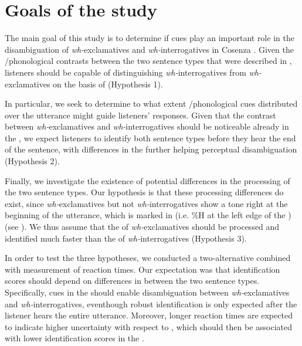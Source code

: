 \documentclass[output=paper]{langsci/langscibook}
\begin{document}
\section{Goals of the study}
\label{sec:kel:3}

The main goal of this study is to determine if  cues play an important role in the disambiguation of \textit{wh-}exclamatives and \textit{wh-}interrogatives in Cosenza . Given the /phonological contrasts between the two sentence types that were described in , listeners should be capable of distinguishing \textit{wh-}interrogatives from \textit{wh-}exclamatives on the basis of  (Hypothesis 1).

In particular, we seek to determine to what extent /phonological cues distributed over the utterance might guide listeners' responses. Given that the contrast between \textit{wh-}exclamatives and \textit{wh-}interrogatives should be noticeable already in the  \citep{Sorianello2011exclamative}, we expect listeners to identify both sentence types before they hear the end of the sentence, with differences in the  further helping perceptual disambiguation (Hypothesis 2).

Finally, we investigate the existence of potential differences in the processing of the two sentence types. Our hypothesis is that these processing differences do exist, since \textit{wh-}exclamatives but not \textit{wh-}interrogatives show a  tone right at the beginning of the utterance, which is marked in  (i.e. \%H at the left edge of the ) (see \citealt{Sorianello2011exclamative}). We thus assume that the  of \textit{wh-}exclamatives should be processed and identified much faster than the  of \textit{wh-}interrogatives (Hypothesis 3).

In order to test the three hypotheses, we conducted a two-alternative  combined with measurement of reaction times. Our expectation was that identification scores should depend on differences in  between the two sentence types. Specifically, cues in the  should enable disambiguation between \textit{wh-}exclamatives and \textit{wh-}interrogatives, even\linebreak though robust identification is only expected after the listener hears the entire utterance. Moreover, longer reaction times are expected to indicate higher uncertainty with respect to , which should then be associated with lower identification scores in the .
\end{document}
